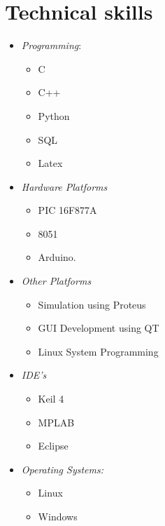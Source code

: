 \documentclass[11pt,a4paper,sans]{moderncv}      	%
\begin{document}
		\section{Technical skills}
		\cvdoubleitem{}
		{
			\begin{itemize}
			\item\textit{Programming}:
				\begin{itemize}
			\item C
				\item C++
				\item Python
				\item SQL
				\item Latex
				\end{itemize}
			\end{itemize}
		}{}
		{
			\begin{itemize}
			\item \textit{Hardware Platforms}
			\begin{itemize}
			\item PIC 16F877A 
				\item 8051 
				\item Arduino.
				\end{itemize}
			\item \textit{Other Platforms}
			\begin{itemize}
			\item Simulation using Proteus
				\item GUI Development using QT
				\item Linux System Programming 
				\end{itemize}
			\end{itemize}
		}
		\cvdoubleitem{}
		{\begin{itemize}
			\item \textit{IDE's}
			\begin{itemize}
			\item Keil 4
				\item MPLAB
				\item Eclipse
				\end{itemize}
			\end{itemize}
		}
		{}
		{\begin{itemize}
			\item\textit{Operating Systems:}
			\begin{itemize}
			\item Linux
				\item Windows
				\end{itemize}
			\end{itemize}}
		
\end{document}
